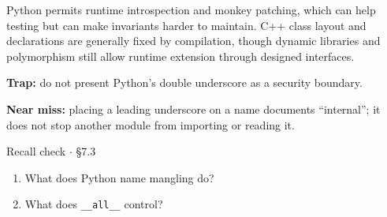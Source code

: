 \documentclass[11pt]{article}
\begin{document}
\begin{keepsection}
Python permits runtime introspection and monkey patching, which can help testing but can make invariants harder to maintain. C++ class layout and declarations are generally fixed by compilation, though dynamic libraries and polymorphism still allow runtime extension through designed interfaces.

\begin{notebox}\textbf{Trap:} do not present Python’s double underscore as a security boundary.\end{notebox}

\begin{notebox}\textbf{Near miss:} placing a leading underscore on a name documents “internal”; it does not stop another module from importing or reading it.\end{notebox}

\begin{recallbox}{Recall check \ensuremath{\cdot} §7.3}
\begin{enumerate}
\item What does Python name mangling do?
\item What does \texttt{\_\_all\_\_} control?
\end{enumerate}

\end{recallbox}
\end{keepsection}
\end{document}
